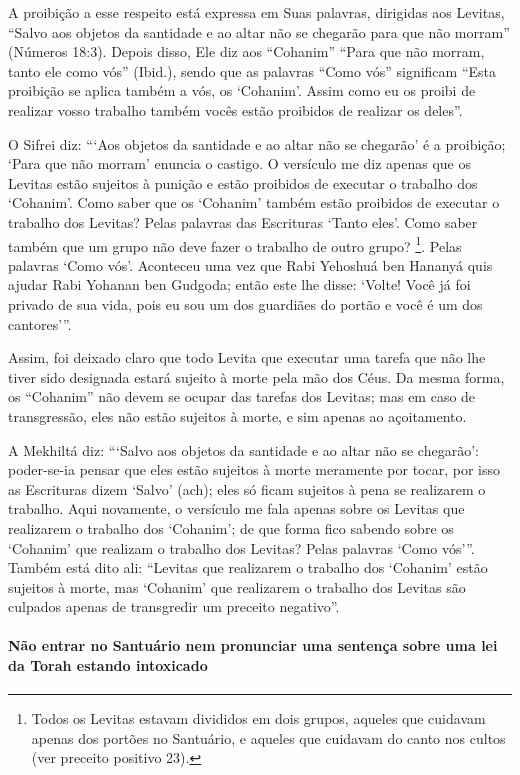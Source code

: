 A proibição a esse respeito está expressa em Suas palavras, dirigidas
aos Levitas, ``Salvo aos objetos da santidade e ao altar não se chegarão
para que não morram'' (Números 18:3). Depois disso, Ele diz aos
``Cohanim'' ``Para que não morram, tanto ele como vós'' (Ibid.), sendo
que as palavras ``Como vós'' significam ``Esta proibição se aplica
também a vós, os `Cohanim'. Assim como eu os proibi de realizar vosso
trabalho também vocês estão proibidos de realizar os deles''.

O Sifrei diz: ```Aos objetos da santidade e ao altar não se chegarão' é
a proibição; `Para que não morram' enuncia o castigo. O versículo me diz
apenas que os Levitas estão sujeitos à punição e estão proibidos de
executar o trabalho dos `Cohanim'. Como saber que os `Cohanim' também
estão proibidos de executar o trabalho dos Levitas? Pelas palavras das
Escrituras `Tanto eles'. Como saber também que um grupo não deve fazer o
trabalho de outro grupo? \footnote{Todos os Levitas estavam divididos em dois grupos, aqueles que cuidavam apenas dos portões no Santuário, e aqueles que cuidavam do
canto nos cultos (ver preceito positivo 23).}. Pelas palavras `Como
vós'. Aconteceu uma vez que Rabi Yehoshuá ben Hananyá quis ajudar Rabi
Yohanan ben Gudgoda; então este lhe disse: `Volte! Você já foi privado
de sua vida, pois eu sou um dos guardiães do portão e você é um dos
cantores'''.

Assim, foi deixado claro que todo Levita que executar uma tarefa que não
lhe tiver sido designada estará sujeito à morte pela mão dos Céus. Da
mesma forma, os ``Cohanim'' não devem se ocupar das tarefas dos Levitas;
mas em caso de transgressão, eles não estão sujeitos à morte, e sim
apenas ao açoitamento.

A Mekhiltá diz: ```Salvo aos objetos da santidade e ao altar não se
chegarão': poder-se-ia pensar que eles estão sujeitos à morte meramente
por tocar, por isso as Escrituras dizem `Salvo' (ach); eles só ficam
sujeitos à pena se realizarem o trabalho. Aqui novamente, o versículo me
fala apenas sobre os Levitas que realizarem o trabalho dos `Cohanim'; de
que forma fico sabendo sobre os `Cohanim' que realizam o trabalho dos Levitas? Pelas palavras `Como
vós'''. Também está dito ali: ``Levitas que realizarem o trabalho dos
`Cohanim' estão sujeitos à morte, mas `Cohanim' que realizarem o
trabalho dos Levitas são culpados apenas de transgredir um preceito
negativo''.

\paragraph{Não entrar no Santuário nem pronunciar uma
sentença sobre uma lei da Torah estando intoxicado}

